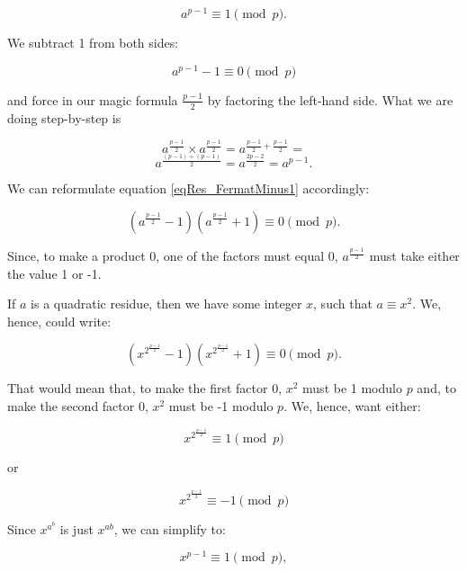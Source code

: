 \documentclass{scrreprt}
\begin{document}
\begin{equation} 
a^{p-1} \equiv 1 \pmod{p}.
\end{equation} 

We subtract 1 from both sides:

\begin{equation}\label{eqRes_FermatMinus1} 
a^{p-1} - 1 \equiv 0 \pmod{p}
\end{equation} 

and force in our magic formula $\frac{p-1}{2}$
by factoring the left-hand side.
What we are doing step-by-step is

\[
a^{\frac{p-1}{2}} \times a^{\frac{p-1}{2}} = a^{\frac{p-1}{2} + \frac{p-1}{2}} =
\]
\[
a^{\frac{(p-1) + (p-1)}{2}} = a^{\frac{2p-2}{2}} = a^{p-1}.
\]

We can reformulate equation \ref{eqRes_FermatMinus1} accordingly: 

\begin{equation} 
(a^{\frac{p-1}{2}} - 1) (a^{\frac{p-1}{2}} + 1) \equiv 0 \pmod{p}.
\end{equation} 

Since, to make a product 0, 
one of the factors must equal 0,
$a^{\frac{p-1}{2}}$ must take either the value 1 or -1.

If $a$ is a quadratic residue, then we have some integer $x$,
such that $a \equiv x^2$. 
We, hence, could write:

\begin{equation} 
(x^{2^{\frac{p-1}{2}}} - 1) (x^{2^{\frac{p-1}{2}}} + 1) \equiv 0 \pmod{p}.
\end{equation} 

That would mean that, to make the first factor 0,
$x^2$ must be 1 modulo $p$ and, to make the second factor 0,
$x^2$ must be -1 modulo $p$.
We, hence, want either:

\begin{equation}\label{eq:ResEu1} 
x^{2^{\frac{p-1}{2}}} \equiv 1 \pmod{p}
\end{equation} 

or

\begin{equation}\label{eq:ResEu2} 
x^{2^{\frac{p-1}{2}}} \equiv -1 \pmod{p}
\end{equation} 

Since $x^{a^b}$ is just $x^{ab}$, we can simplify to:

\begin{equation} 
x^{p-1} \equiv 1 \pmod{p},
\end{equation} 
\end{document}
